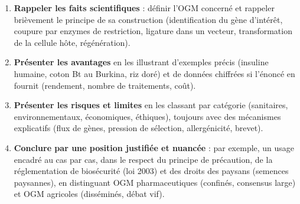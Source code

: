 \documentclass[11pt]{article}
\begin{document}
\begin{methode}
\begin{enumerate}
\item \textbf{Rappeler les faits scientifiques} : définir l'OGM concerné et rappeler brièvement le principe de sa construction (identification du gène d'intérêt, coupure par enzymes de restriction, ligature dans un vecteur, transformation de la cellule hôte, régénération).
\item \textbf{Présenter les avantages} en les illustrant d'exemples précis (insuline humaine, coton Bt au Burkina, riz doré) et de données chiffrées si l'énoncé en fournit (rendement, nombre de traitements, coût).
\item \textbf{Présenter les risques et limites} en les classant par catégorie (sanitaires, environnementaux, économiques, éthiques), toujours avec des mécanismes explicatifs (flux de gènes, pression de sélection, allergénicité, brevet).
\item \textbf{Conclure par une position justifiée et nuancée} : par exemple, un usage encadré au cas par cas, dans le respect du principe de précaution, de la réglementation de biosécurité (loi 2003) et des droits des paysans (semences paysannes), en distinguant OGM pharmaceutiques (confinés, consensus large) et OGM agricoles (disséminés, débat vif).
\end{enumerate}
\end{methode}
\end{document}
